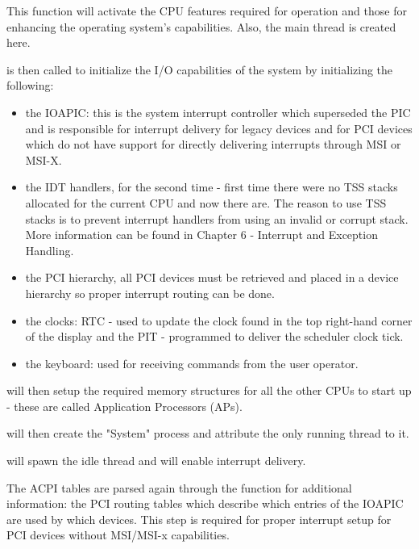 \begin{appendices}
This function will activate the CPU features required for operation and those for enhancing the
operating system's capabilities. Also, the main thread is created here.

 is then called to initialize the I/O capabilities of the system by
initializing the following:
\begin{itemize}
	\item the IOAPIC: this is the system interrupt controller which superseded the PIC and is
responsible for interrupt delivery for legacy devices and for PCI devices which do not have
support for directly delivering interrupts through MSI or MSI-X.

	\item the IDT handlers, for the second time - first time there were no TSS stacks allocated for
the current CPU and now there are. The reason to use TSS stacks is to prevent interrupt handlers
from using an invalid or corrupt stack. More information can be found in \cite{intelSys}
Chapter 6 - Interrupt and Exception Handling.

	\item the PCI hierarchy, all PCI devices must be retrieved and placed in a device hierarchy so
proper interrupt routing can be done.

	\item the clocks: RTC - used to update the clock found in the top right-hand corner of the
display and the PIT - programmed to deliver the scheduler clock tick.

	\item the keyboard: used for receiving commands from the user operator.
\end{itemize}

 will then setup the required memory structures for all the other CPUs to
start up - these are called Application Processors (APs).

 will then create the "System" process and attribute the only
running thread to it.

 will spawn the idle thread and will enable interrupt
delivery.

The ACPI tables are parsed again through the  function for additional
information: the PCI routing tables which describe which entries of the IOAPIC are used by which
devices. This step is required for proper interrupt setup for PCI devices without MSI/MSI-x
capabilities.


\end{appendices}

